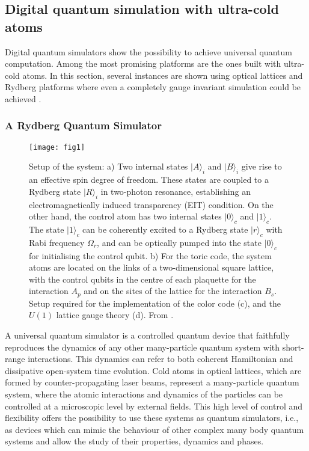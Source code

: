 \documentclass[epj,final]{svjour}
\begin{document}
\subsection{Digital quantum simulation with ultra-cold atoms}

Digital quantum simulators show the possibility to achieve universal quantum computation. Among the most promising platforms are the ones built with ultra-cold atoms. In this section, several instances are shown using optical lattices and Rydberg platforms where even a completely gauge invariant simulation could be achieved \cite{weimer2010rydberg,tagliacozzo2013optical,tagliacozzo2013simulation,zohar2017digital,zohar2017digitalA}. 

\subsubsection{A Rydberg Quantum Simulator\cite{weimer2010rydberg}}

\begin{figure}[h!]
\texttt{[image: fig1]} 
\caption{Setup of the system: a) Two internal states $|A\rangle_{i}$ and $|B\rangle_{i}$ give rise to an effective spin degree of freedom. These states are coupled to a Rydberg state $|R\rangle_{i}$ in two-photon resonance, establishing an electromagnetically induced transparency (EIT) condition. On the other hand, the control atom has two internal states $|0\rangle_{c}$ and $|1\rangle_{c}$. The state $|1\rangle_{c}$ can be coherently excited to a Rydberg state $|r\rangle_{c}$ with Rabi frequency $\Omega_{r}$, and can be optically pumped into the state $|0\rangle_{c}$ for initialising the control qubit. b) For the toric code, the system atoms are located on the links of a two-dimensional square lattice, with the control qubits in the centre of each plaquette for the interaction $A_{p}$ and on the sites of the lattice for the interaction $B_{s}$. Setup required for the implementation of the color code (c), and the $U(1)$ lattice gauge theory (d). From \cite{weimer2010rydberg}. }
\label{fig1} 
\end{figure}

A universal quantum simulator is a controlled quantum device that faithfully reproduces the dynamics of any other many-particle quantum system with short-range interactions. This dynamics can refer to both coherent Hamiltonian and dissipative open-system time evolution. Cold atoms in optical lattices, which are formed by counter-propagating laser beams, represent a many-particle quantum system, where the atomic interactions and dynamics of the particles can be controlled at a microscopic level by external fields. This high level of control and flexibility offers the possibility to use these systems as quantum simulators, i.e., as devices which can mimic the behaviour of other complex many body quantum systems and allow the study of their properties, dynamics and phases.
\end{document}
